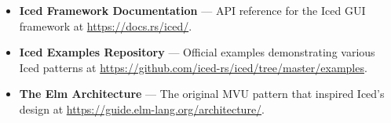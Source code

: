 \begin{itemize}
  \item \textbf{Iced Framework Documentation} --- API reference for the Iced GUI framework at \url{https://docs.rs/iced/}.
  \item \textbf{Iced Examples Repository} --- Official examples demonstrating various Iced patterns at \url{https://github.com/iced-rs/iced/tree/master/examples}.
  \item \textbf{The Elm Architecture} --- The original MVU pattern that inspired Iced's design at \url{https://guide.elm-lang.org/architecture/}.
\end{itemize}

